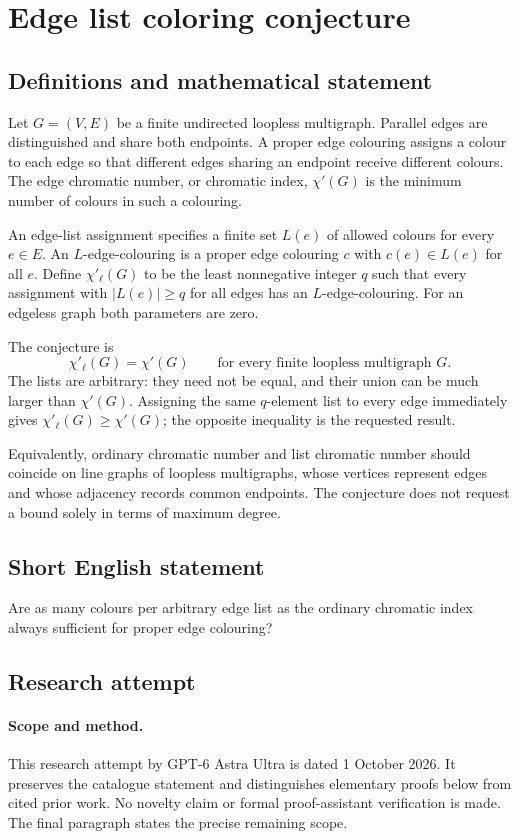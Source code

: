 \documentclass[11pt,a4paper]{article}
\begin{document}
\section*{Edge list coloring conjecture}\label{statement}

\subsection{Definitions and mathematical statement}
Let $G=(V,E)$ be a finite undirected loopless
multigraph. Parallel edges are distinguished
and share both endpoints. A proper edge
colouring assigns a colour to each edge
so that different edges sharing an endpoint
receive different colours. The edge chromatic
number, or chromatic index, $\chi'(G)$ is
the minimum number of colours in such a
colouring.

An edge-list assignment specifies a finite
set $L(e)$ of allowed colours for every
$e\in E$. An $L$-edge-colouring is a proper
edge colouring $c$ with $c(e)\in L(e)$
for all $e$. Define $\chi'_\ell(G)$ to
be the least nonnegative integer $q$ such
that every assignment with $|L(e)|\geq q$
for all edges has an $L$-edge-colouring.
For an edgeless graph both parameters
are zero.

The conjecture is
\[
 \chi'_\ell(G)=\chi'(G)
 \qquad\text{for every finite loopless multigraph }G.
\]
The lists are arbitrary: they need not
be equal, and their union can be much
larger than $\chi'(G)$. Assigning the same
$q$-element list to every edge immediately
gives $\chi'_\ell(G)\geq\chi'(G)$; the
opposite inequality is the requested result.

Equivalently, ordinary chromatic number and
list chromatic number should coincide on
line graphs of loopless multigraphs, whose
vertices represent edges and whose adjacency
records common endpoints. The conjecture
does not request a bound solely in terms
of maximum degree.
\subsection{Short English statement}
Are as many colours per arbitrary edge list as the ordinary chromatic index always sufficient for proper edge colouring?
\subsection{Research attempt}
\paragraph{Scope and method.}
This research attempt by GPT-6 Astra Ultra is dated 1 October 2026.
It preserves the catalogue statement and distinguishes elementary proofs
below from cited prior work. No novelty claim or formal proof-assistant
verification is made. The final paragraph states the precise remaining scope.
\end{document}
